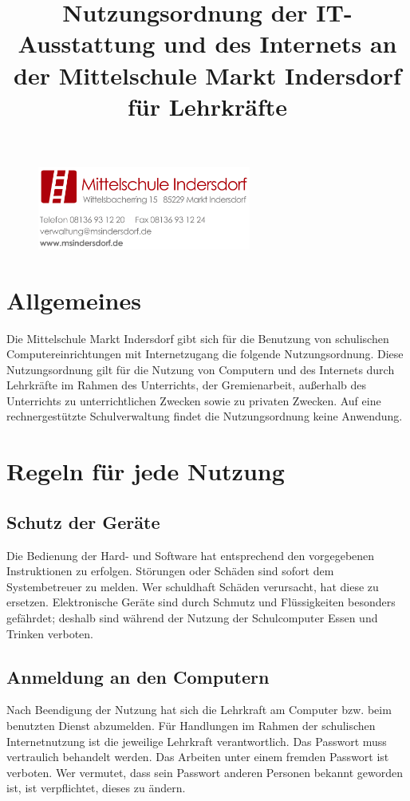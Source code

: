 \documentclass[a4paper, parskip]{scrartcl}
\title{Nutzungsordnung der IT-Ausstattung und des Internets an der
Mittelschule Markt Indersdorf für Lehrkräfte}
\date{}
\begin{document}
\begin{figure}[h]
	\flushright
	\includegraphics[width=7cm]{logo_briefkopf}
	\maketitle
\end{figure}

\section{Allgemeines}
Die Mittelschule Markt Indersdorf gibt sich für die Benutzung von schulischen
Computereinrichtungen mit Internetzugang die folgende Nutzungsordnung. Diese
Nutzungsordnung gilt für die Nutzung von Computern und des Internets durch
Lehrkräfte im Rahmen des Unterrichts, der Gremienarbeit, außerhalb des
Unterrichts zu unterrichtlichen Zwecken sowie zu privaten Zwecken. Auf eine
rechnergestützte Schulverwaltung findet die Nutzungsordnung keine Anwendung.

\section{Regeln für jede Nutzung}
\subsection{Schutz der Geräte}
Die Bedienung der Hard- und Software hat entsprechend den vorgegebenen
Instruktionen zu erfolgen. Störungen oder Schäden sind sofort dem
Systembetreuer zu melden. Wer schuldhaft Schäden verursacht, hat diese zu
ersetzen. Elektronische Geräte sind durch Schmutz und Flüssigkeiten besonders
gefährdet; deshalb sind während der Nutzung der Schulcomputer Essen und Trinken
verboten.
\subsection{Anmeldung an den Computern}
Nach Beendigung der Nutzung hat sich die Lehrkraft am Computer bzw. beim benutzten
Dienst abzumelden. Für Handlungen im Rahmen der schulischen Internetnutzung ist
die jeweilige Lehrkraft verantwortlich. Das Passwort muss vertraulich behandelt
werden. Das Arbeiten unter einem fremden Passwort ist verboten. Wer vermutet,
dass sein Passwort anderen Personen bekannt geworden ist, ist verpflichtet,
dieses zu ändern.
\end{document}
